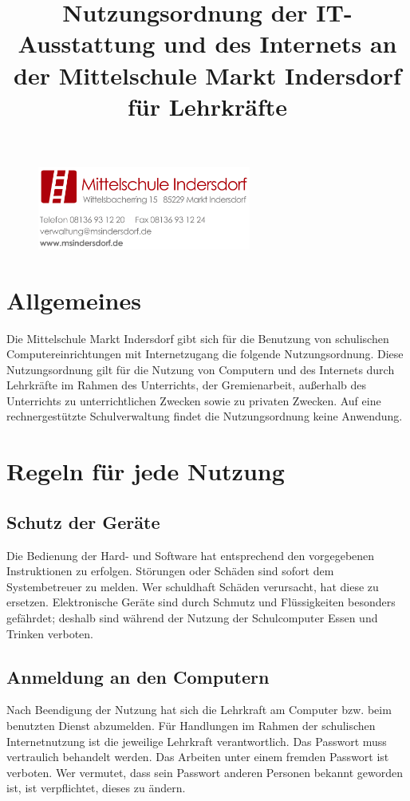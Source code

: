 \documentclass[a4paper, parskip]{scrartcl}
\title{Nutzungsordnung der IT-Ausstattung und des Internets an der
Mittelschule Markt Indersdorf für Lehrkräfte}
\date{}
\begin{document}
\begin{figure}[h]
	\flushright
	\includegraphics[width=7cm]{logo_briefkopf}
	\maketitle
\end{figure}

\section{Allgemeines}
Die Mittelschule Markt Indersdorf gibt sich für die Benutzung von schulischen
Computereinrichtungen mit Internetzugang die folgende Nutzungsordnung. Diese
Nutzungsordnung gilt für die Nutzung von Computern und des Internets durch
Lehrkräfte im Rahmen des Unterrichts, der Gremienarbeit, außerhalb des
Unterrichts zu unterrichtlichen Zwecken sowie zu privaten Zwecken. Auf eine
rechnergestützte Schulverwaltung findet die Nutzungsordnung keine Anwendung.

\section{Regeln für jede Nutzung}
\subsection{Schutz der Geräte}
Die Bedienung der Hard- und Software hat entsprechend den vorgegebenen
Instruktionen zu erfolgen. Störungen oder Schäden sind sofort dem
Systembetreuer zu melden. Wer schuldhaft Schäden verursacht, hat diese zu
ersetzen. Elektronische Geräte sind durch Schmutz und Flüssigkeiten besonders
gefährdet; deshalb sind während der Nutzung der Schulcomputer Essen und Trinken
verboten.
\subsection{Anmeldung an den Computern}
Nach Beendigung der Nutzung hat sich die Lehrkraft am Computer bzw. beim benutzten
Dienst abzumelden. Für Handlungen im Rahmen der schulischen Internetnutzung ist
die jeweilige Lehrkraft verantwortlich. Das Passwort muss vertraulich behandelt
werden. Das Arbeiten unter einem fremden Passwort ist verboten. Wer vermutet,
dass sein Passwort anderen Personen bekannt geworden ist, ist verpflichtet,
dieses zu ändern.
\end{document}
